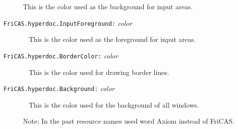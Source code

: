 \begin{description}
This is the color used as the background for input areas.
\item[{\tt FriCAS.hyperdoc.InputForeground:} {\it color}] \ \newline
This is the color used as the foreground for input areas.
\item[{\tt FriCAS.hyperdoc.BorderColor:} {\it color}] \ \newline
This is the color used for drawing border lines.
\item[{\tt FriCAS.hyperdoc.Background:} {\it color}] \ \newline
This is the color used for the background of all windows.

Note: In the past resource names used word Axiom instead of FriCAS.

\end{description}
\begin{SysCmdOutput}
\end{SysCmdOutput}
